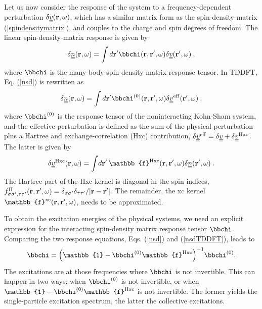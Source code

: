 \documentclass[aps,prb,twocolumn,superscriptaddress]{revtex4-2}
\newcommand{\bfr}{{\bf r}}
\begin{document}
Let us now consider the response of the system to a frequency-dependent perturbation $\delta\underline{\underline v}(\bfr,\omega)$, which has a similar
matrix form as the spin-density-matrix (\ref{spindensitymatrix}), and couples to the charge and spin degrees of freedom.
The linear spin-density-matrix response is given by
\begin{equation}\label{nsd}
\delta\underline{\underline n}(\bfr,\omega) = \int d\bfr' \mathbb{\bbchi}(\bfr,\bfr',\omega) \delta \underline{\underline v}(\bfr',\omega)\:,
\end{equation}
where $\mathbb{\bbchi}$ is the many-body spin-density-matrix response tensor.
In TDDFT, Eq. (\ref{nsd}) is rewritten as
\begin{equation}\label{nsdTDDFT}
\delta\underline{\underline n}(\bfr,\omega) = \int d\bfr' \mathbb{\bbchi}^{(0)}(\bfr,\bfr',\omega) \delta \underline{\underline v}^{\rm eff}(\bfr',\omega)\:,
\end{equation}
where $\mathbb{\bbchi}^{(0)}$ is the response tensor of the noninteracting Kohn-Sham system, and the effective perturbation is defined as the sum
of the physical perturbation plus a Hartree and exchange-correlation (Hxc) contribution,
$\delta \underline{\underline{v}}^{\rm eff} = \delta \underline{\underline{v}} + \delta \underline{\underline{v}}^{\rm Hxc}$. The latter is given by
\begin{equation}\label{vsd}
\delta \underline{\underline{v}}^{\rm Hxc} (\bfr,\omega) =
\int\!d\bfr' \: \mathbb{f}^{\rm Hxc}(\bfr,\bfr',\omega) \delta\underline{\underline n}(\bfr',\omega) \;.
\end{equation}
The Hartree part of the Hxc kernel is diagonal in the spin indices,
$f^{\rm H}_{\sigma\sigma',\tau \tau'}(\bfr,\bfr',\omega) = \delta_{\sigma\sigma'}\delta_{\tau \tau'} / |\bfr - \bfr'|$.
The remainder, the xc kernel $\mathbb{f}^{\rm xc}(\bfr,\bfr',\omega)$, needs to be approximated.

To obtain the excitation energies of the physical systems, we need an explicit expression for the interacting spin-density matrix response tensor $\mathbb{\bbchi}$.
Comparing the two response equations, Eqs. (\ref{nsd}) and (\ref{nsdTDDFT}), leads to
\begin{equation}\label{fullresponse}
\mathbb{\bbchi} = \Big( \mathbb{1} - \mathbb{\bbchi}^{(0)} \mathbb{f}^{\rm Hxc}\Big)^{-1}\mathbb{\bbchi}^{(0)}.
\end{equation}
The excitations are at those frequencies where $\mathbb{\bbchi}$ is not invertible. This can happen in two ways:
when $\mathbb{\bbchi}^{(0)}$ is not invertible, or when $\mathbb{1} - \mathbb{\bbchi}^{(0)} \mathbb{f}^{\rm Hxc}$ is not invertible.
The former yields the single-particle excitation spectrum, the latter the collective excitations.
\end{document}
